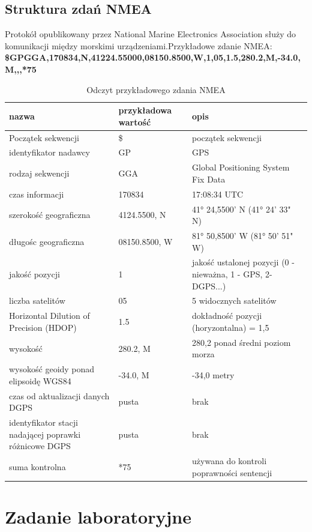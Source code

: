 \documentclass{article}
\begin{document}
    \subsection{Struktura zdań NMEA}
    \raggedright
    Protokół opublikowany przez National Marine Electronics Association służy do komunikacji między morskimi 
    urządzeniami.Przykładowe zdanie NMEA: \linebreak
    \textbf{\$GPGGA,170834,N,41224.55000,08150.8500,W,1,05,1.5,280.2,M,-34.0,M,,,*75}
    \begin{table}[ht]
      \centering
      \begin{tabular}{p{7cm} p{3cm} p{4cm}}
        \toprule
        nazwa & przykładowa wartość &	opis \\
        \midrule
        Początek sekwencji& \$ &	początek sekwencji\\
        identyfikator nadawcy &	GP &	GPS\\
        rodzaj sekwencji &	GGA &	Global Positioning System Fix Data\\
        czas informacji &	170834 &	17:08:34 UTC\\
        szerokość geograficzna &	4124.5500, N &	41° 24,5500' N (41° 24' 33" N)\\
        długośc geograficzna &	08150.8500, W &	81° 50,8500' W (81° 50' 51" W)\\
        jakość pozycji &	1 &	jakość ustalonej pozycji (0 - nieważna, 1 - GPS, 2- DGPS...)\\
        liczba satelitów &	05 &	5 widocznych satelitów\\
        Horizontal Dilution of Precision (HDOP) &	1.5 &	dokładność pozycji (horyzontalna) = 1,5\\
        wysokość &	280.2, M & 280,2 ponad średni poziom morza\\
        wysokość geoidy ponad elipsoidę WGS84 &	-34.0, M & -34,0 metry\\
        czas od aktualizacji danych DGPS & pusta & brak\\
        identyfikator stacji nadającej poprawki różnicowe DGPS & pusta & brak\\
        suma kontrolna & *75 & używana do kontroli poprawności sentencji \\
        \bottomrule
      \end{tabular}
      \caption{Odczyt przykładowego zdania NMEA}
      \label{tab:nmea}
    \end{table}
    \FloatBarrier
  \raggedright
  \section{Zadanie laboratoryjne}
\end{document}
